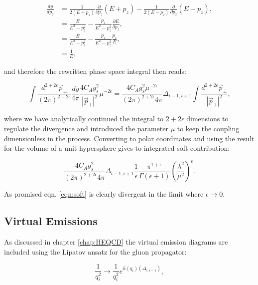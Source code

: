 			\begin{align}
				\frac{dy}{dp_z} &= \frac{1}{2(E+p_z)} \frac{\partial}{\partial p_z}(E+p_z) - \frac{1}{2(E-p_z)}\frac{\partial}{\partial p_z}(E-p_z),\\
				&= \frac{E}{E^2-p_z^2} - \frac{p_z}{E^2-p_z^2}\frac{\partial E}{\partial p_z},\\
				&= \frac{E}{E^2-p_z^2} - \frac{p_z}{E^2-p_z^2}\frac{p_z}{E},\\
				&= \frac{1}{E},
			\end{align}

			and therefore the rewritten phase space integral then reads:

			\begin{equation}
				\int\frac{d^{2+2\epsilon}\vec{p}_{\perp}}{(2\pi)^{2+2\epsilon}}\frac{dy}{4\pi}\frac{4C_Ag_s^2}
					{|\vec{p}_\perp|^2}\mu^{-2\epsilon} = \frac{4C_Ag_s^2\mu^{-2\epsilon}}{(2\pi)^{2+2\epsilon}4\pi}
					\Delta_{i-1, i+1}\int\frac{d^{2+2\epsilon}\vec{p}_{\perp}}{|\vec{p}_\perp|^2},
			\end{equation}

			where we have analytically continued the integral to $2+2\epsilon$ dimensions to regulate the
			divergence and introduced the parameter $\mu$ to keep the coupling dimensionless in the process.
			Converting to polar coordinates and using the result for the volume of a unit hypersphere gives
			to integrated soft contribution:

			\begin{equation}
				\frac{4C_Ag_s^2}{(2\pi)^{2+2\epsilon}4\pi}\Delta_{i-1, i+1}
				\frac{1}{\epsilon}\frac{\pi^{1+\epsilon}}
				{\Gamma(\epsilon+1)}\left(\frac{\lambda^2}{\mu^2}\right)^\epsilon.
				\label{eqn:soft}
			\end{equation}

			As promised eqn. \eqref{eqn:soft} is clearly divergent in the limit where $\epsilon\to0$.

	\subsection{Virtual Emissions}
		\label{sub:subsection_name}

		As discussed in chapter \ref{chap:HEQCD} the virtual emission diagrams are included
		using the Lipatov ansatz for the gluon propagator:

		\begin{equation}
			\frac{1}{q_i^2}\longrightarrow\frac{1}{q_i^2}e^{\hat{\alpha}(q_i)(\Delta_{i,i-1})},
		\end{equation}

